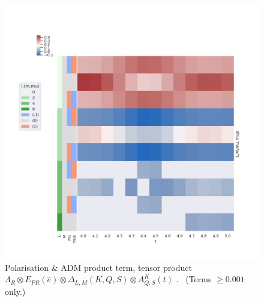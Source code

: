 \documentclass[10pt]{article}
\begin{document}
\begin{figure}[]
\begin{center}
\includegraphics[width=\textwidth,height=\dimexpr\textheight-4\baselineskip-\abovecaptionskip-\belowcaptionskip\relax,keepaspectratio]{figures/basisPlots_090822_polProd_M0.png}
\caption{Polarisation \& ADM product term, tensor product \(\Lambda_{R}\otimes E_{PR}(\hat{e})\otimes\Delta_{L,M}(K,Q,S)\otimes
A^{K}_{Q,S}(t)\) .     (Terms \(\ge0.001\) only.)\label{652406}}
\end{center}
\end{figure}
\end{document}
